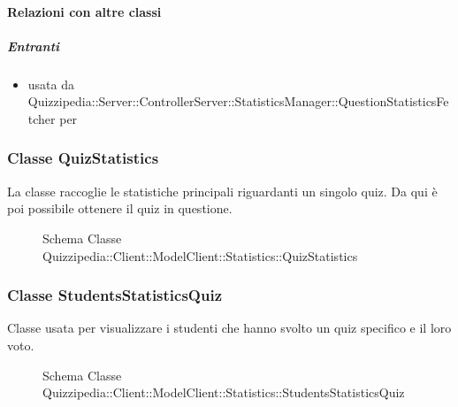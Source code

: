 \paragraph{Relazioni con altre classi}
\subparagraph{Entranti}
\begin{itemize}
\item usata da Quizzipedia::Server::ControllerServer::StatisticsManager::QuestionStatisticsFetcher per 
\end{itemize}
\subsubsection{Classe QuizStatistics}
La classe raccoglie le statistiche principali riguardanti un singolo quiz. Da qui è poi possibile ottenere il quiz in questione.
\begin{figure}[H]
\centering
\noindent{}
\caption[Schema Classe QuizStatistics]{Schema Classe Quizzipedia::Client::ModelClient::Statistics::QuizStatistics}
\end{figure}
\subsubsection{Classe StudentsStatisticsQuiz}
Classe usata per visualizzare i studenti che hanno svolto un quiz specifico e il loro voto.
\begin{figure}[H]
\centering
\noindent{}
\caption[Schema Classe StudentsStatisticsQuiz]{Schema Classe Quizzipedia::Client::ModelClient::Statistics::StudentsStatisticsQuiz}
\end{figure}
